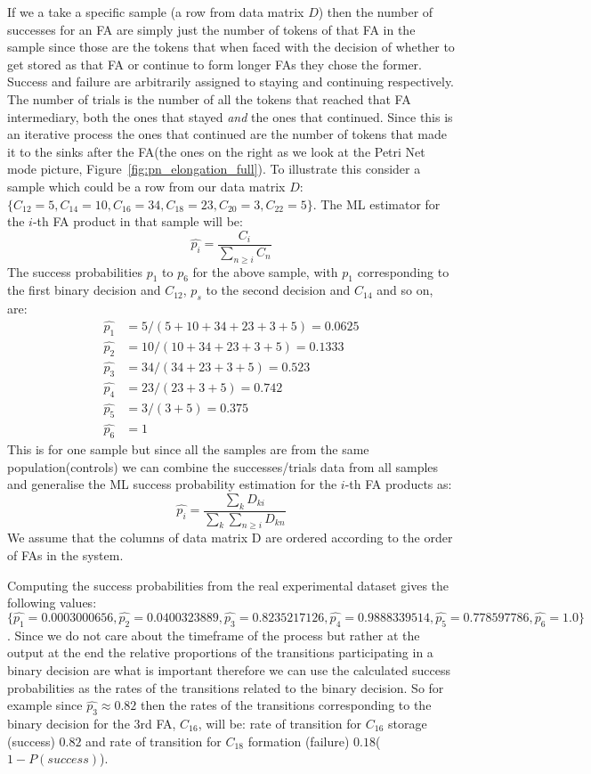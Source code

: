 If we a take a specific sample (a row from data matrix $D$) then the
number of successes for an FA are simply just the number of tokens of
that FA in the sample since those are the tokens that when faced with
the decision of whether to get stored as that FA or continue to form
longer FAs they chose the former. Success and failure are arbitrarily
assigned to staying and continuing respectively. The number of trials
is the number of all the tokens that reached that FA intermediary, both
the ones that stayed \textit{and} the ones that continued. Since this
is an iterative process the ones that continued are the number of
tokens that made it to the sinks after the FA(the ones on the right as
we look at the Petri Net mode picture,
Figure~\ref{fig:pn_elongation_full}). To illustrate this consider a
sample which could be a row from our data matrix $D$: $\{C_{12}=5,
C_{14}=10, C_{16}=34, C_{18}=23, C_{20}=3, C_{22}=5\}$. The ML
estimator for the $i$-th FA product in that sample will be:
\begin{equation*}
\hat{p_i} = \frac{C_i}{\sum_{n \geq i} C_n}
\end{equation*}
The success probabilities $p_1$ to $p_6$ for the above sample, with $p_1$ corresponding to
the first binary decision and $C_{12}$, $p_s$ to the second decision
and $C_{14}$ and so on, are:
\begin{align*}
\hat{p_1} & = 5/(5+10+34+23+3+5) = 0.0625\\
\hat{p_2} & = 10 / (10+34+23+3+5) = 0.1333\\
\hat{p_3} & = 34 / (34+23+3+5) = 0.523\\
\hat{p_4} & = 23 / (23+3+5) = 0.742\\
\hat{p_5} & = 3 / (3+5) = 0.375\\
\hat{p_6} & = 1
\end{align*}
This is for one sample but since all the samples are from the same
population(controls) we can combine the successes/trials data from all
samples and generalise the ML success probability estimation for the
$i$-th FA products as:
\begin{equation*}
\hat{p_i} = \frac{\sum_k D_{ki}}{\sum_k \sum_{n\geq i} D_{kn}}
\end{equation*}
We assume that the columns of data matrix D are ordered according to
the order of FAs in the system.

Computing the success probabilities from the real experimental dataset
gives the following values: $\{\hat{p_1} = 0.0003000656,
\hat{p_2}=0.0400323889, \hat{p_3}=0.8235217126,
\hat{p_4}=0.9888339514, \hat{p_5}=0.778597786, \hat{p_6}=1.0\}$. Since
we do not care about the timeframe of the process but rather at the
output at the end the relative proportions of the transitions
participating in a binary decision are what is important therefore we
can use the calculated success probabilities as the rates of the
transitions related to the binary decision. So for example since
$\hat{p_3}\approx0.82$ then the rates of the transitions corresponding to the
binary decision for the 3rd FA, $C_{16}$, will be: rate of transition
for $C_{16}$ storage (success) $0.82$ and rate of transition for
$C_{18}$ formation (failure) $0.18$($1-P(success)$).



